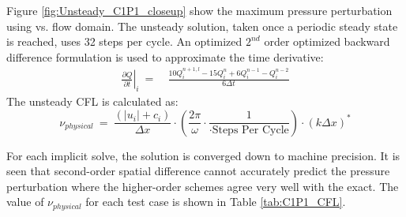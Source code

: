 \documentclass[conf]{new-aiaa}
\begin{document}
Figure \ref{fig:Unsteady_C1P1_closeup} show the maximum pressure perturbation using vs. flow domain. 
The unsteady solution, taken once a periodic steady state is reached, uses 32 steps per cycle. An optimized $2^{nd}$ order optimized backward difference formulation \cite{HixonImplicit} is used to approximate the time derivative:
\begin{equation}
	\begin{split}
		\label{eq:2ndOrderdQdT}
  			\left.\frac{\partial{Q}}{\partial{t}}\right|_i~=&~\frac{10Q_i^{n+1, l}-15Q_i^n+6Q_i^{n-1}-Q_i^{n-2}}{6\Delta{t}}
	\end{split}
\end{equation}
The unsteady CFL is calculated as:
\begin{equation*}
	\nu_{physical}
  			~=~\frac{\left(\left|u_i\right|+c_i\right)}{\Delta{x}}\cdot\left(\frac{2\pi}{\omega}\cdot\frac{1}{\cdot \text{Steps~Per~Cycle}}\right)\cdot\left(k\Delta{x}\right)^*
\end{equation*}

For each implicit solve, the solution is converged down to machine precision. It is seen that second-order spatial difference cannot accurately predict the pressure perturbation where the higher-order schemes agree very well with the exact. 
The value of $\nu_{physical}$ for each test case is shown in Table \ref{tab:C1P1_CFL}.   


%
%
\end{document}
